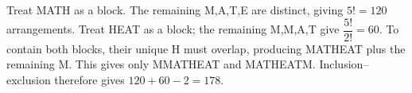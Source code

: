 Treat MATH as a block. The remaining M,A,T,E are distinct, giving $5!=120$ arrangements. Treat HEAT as a block; the remaining M,M,A,T give $\dfrac{5!}{2!}=60$. To contain both blocks, their unique H must overlap, producing MATHEAT plus the remaining M. This gives only MMATHEAT and MATHEATM. Inclusion--exclusion therefore gives $120+60-2=\boxed{178}$.
